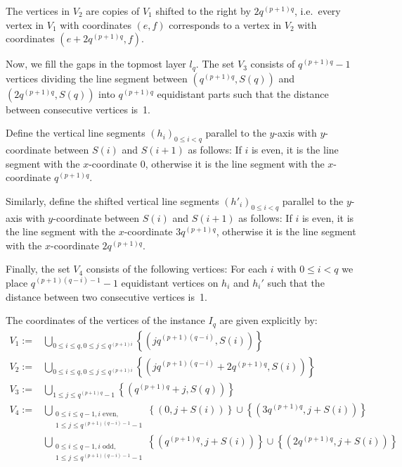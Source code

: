 \documentclass[a4paper, 11pt]{article}
\begin{document}
The vertices in $V_2$ are copies of $V_1$ shifted to the right by $2q^{(p+1)q}$, i.e.\ every vertex in $V_1$ with coordinates $(e,f)$ corresponds to a vertex in $V_2$ with coordinates $(e + 2q^{(p+1)q},f)$. 

Now, we fill the gaps in the topmost layer $l_q$. The set $V_3$ consists of $q^{(p+1)q}-1$ vertices dividing the line segment between $(q^{(p+1)q}, S(q))$ and $(2q^{(p+1)q},S(q))$ into $q^{(p+1)q}$ equidistant parts such that the distance between consecutive vertices is~1.

Define the vertical line segments $(h_i)_{0\leq i <q}$ parallel to the $y$-axis with $y$-coordinate between  $S(i)$ and $S(i+1)$ as follows: If $i$ is even, it is the line segment with the $x$-coordinate 0, otherwise it is the line segment with the $x$-coordinate $q^{(p+1)q}$. 

Similarly, define the shifted vertical line segments $(h'_i)_{0\leq i <q}$ parallel to the $y$-axis with $y$-coordinate between $S(i)$ and $S(i+1)$ as follows: If $i$ is even, it is the line segment with the $x$-coordinate $3q^{(p+1)q}$, otherwise it is the line segment with the $x$-coordinate $2q^{(p+1)q}$.

Finally, the set $V_4$ consists of the following vertices: For each $i$ with $0\le i < q$ we place $q^{(p+1)(q-i)-1}-1$ equidistant vertices on $h_i$ and $h_i'$ such that the distance between two consecutive vertices is~1.

The coordinates of the vertices of the instance $I_q$ are given explicitly by:
\begin{align*}
V_1 :=&\bigcup_{0\leq i\leq q, 0\leq j \leq q^{(p+1)i}} \left\{(jq^{(p+1)(q-i)},S(i))\right\}\\
V_2:=&\bigcup_{0\leq i\leq q, 0\leq j \leq q^{(p+1)i}} \left\{(jq^{(p+1)(q-i)}+2q^{(p+1)q}, S(i))\right\}\\
V_3:=&\bigcup_{1\leq j\leq q^{(p+1)q}-1} \left\{(q^{(p+1)q}+j,S(q))\right\}\\
V_4:=&\bigcup_{\substack{0\leq i \leq q-1, i \text{ even},\\ 1\leq j\leq q^{(p+1)(q-i)-1}-1}} \left\{(0,j+S(i))\right\} \cup \left\{(3q^{(p+1)q},j+S(i))\right\}\\
&\bigcup_{\substack{0\leq i \leq q-1, i \text{ odd},\\ 1\leq j\leq q^{(p+1)(q-i)-1}-1}} \left\{(q^{(p+1)q},j+S(i))\right\} \cup \left\{(2q^{(p+1)q},j+S(i))\right\}
\end{align*}
\end{document}

